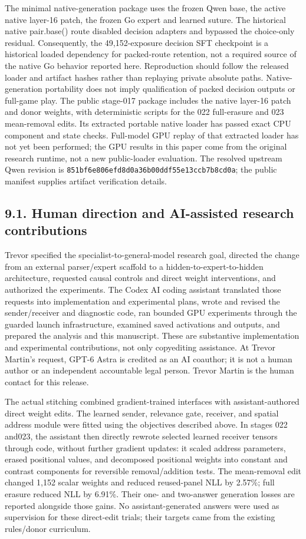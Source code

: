 \documentclass[11pt]{article}
\begin{document}
The minimal native-generation package uses the frozen Qwen base, the active native layer-16 patch, the frozen Go expert and learned suture. The historical native pair.base() route disabled decision adapters and bypassed the choice-only residual. Consequently, the 49,152-exposure decision SFT checkpoint is a historical loaded dependency for packed-route retention, not a required source of the native Go behavior reported here. Reproduction should follow the released loader and artifact hashes rather than replaying private absolute paths. Native-generation portability does not imply qualification of packed decision outputs or full-game play. The public stage-017 package includes the native layer-16 patch and donor weights, with deterministic scripts for the 022 full-erasure and 023 mean-removal edits. Its extracted portable native loader has passed exact CPU component and state checks. Full-model GPU replay of that extracted loader has not yet been performed; the GPU results in this paper come from the original research runtime, not a new public-loader evaluation. The resolved upstream Qwen revision is \texttt{851bf6e8\allowbreak 06efd8d0\allowbreak a36b00dd\allowbreak f55e13cc\allowbreak b7b8cd0a}; the public manifest supplies artifact verification details.

\subsection*{9.1. Human direction and AI-assisted research contributions}
Trevor specified the specialist-to-general-model research goal, directed the change from an external parser/expert scaffold to a hidden-to-expert-to-hidden architecture, requested causal controls and direct weight interventions, and authorized the experiments. The Codex AI coding assistant translated those requests into implementation and experimental plans, wrote and revised the sender/receiver and diagnostic code, ran bounded GPU experiments through the guarded launch infrastructure, examined saved activations and outputs, and prepared the analysis and this manuscript. These are substantive implementation and experimental contributions, not only copyediting assistance. At Trevor Martin's request, GPT-6 Astra is credited as an AI coauthor; it is not a human author or an independent accountable legal person. Trevor Martin is the human contact for this release.

The actual stitching combined gradient-trained interfaces with assistant-authored direct weight edits. The learned sender, relevance gate, receiver, and spatial address module were fitted using the objectives described above. In stages 022 and023, the assistant then directly rewrote selected learned receiver tensors through code, without further gradient updates: it scaled address parameters, erased positional values, and decomposed positional weights into constant and contrast components for reversible removal/addition tests. The mean-removal edit changed 1,152 scalar weights and reduced reused-panel NLL by 2.57\%; full erasure reduced NLL by 6.91\%. Their one- and two-answer generation losses are reported alongside those gains. No assistant-generated answers were used as supervision for these direct-edit trials; their targets came from the existing rules/donor curriculum.
\end{document}
